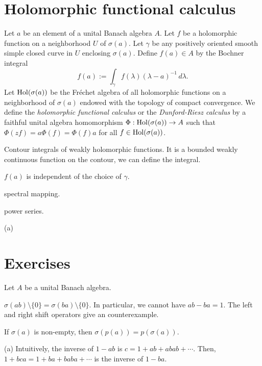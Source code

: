 \documentclass{../../large}
\begin{document}
\begin{prb}
\end{prb}


\section{Holomorphic functional calculus}


\begin{prb}
Let $a$ be an element of a unital Banach algebra $A$.
Let $f$ be a holomorphic function on a neighborhood $U$ of $\sigma(a)$.
Let $\gamma$ be any positively oriented smooth simple closed curve in $U$ enclosing $\sigma(a)$.
Define $f(a)\in A$ by the Bochner integral
\[f(a):=\int_\gamma f(\lambda)(\lambda-a)^{-1}\,d\lambda.\]
Let $\operatorname{Hol}(\sigma(a))$ be the Fr\'echet algebra of all holomorphic functions on a neighborhood of $\sigma(a)$ endowed with the topology of compact convergence.
We define the \emph{holomorphic functional calculus} or the \emph{Dunford-Riesz calculus} by a faithful unital algebra homomorphism $\Phi:\operatorname{Hol}(\sigma(a))\to A$ such that $\Phi(zf)=a\Phi(f)=\Phi(f)a$ for all $f\in\operatorname{Hol}(\sigma(a))$.

Contour integrals of weakly holomorphic functions.
It is a bounded weakly continuous function on the contour, we can define the integral.


\begin{parts}
\item $f(a)$ is independent of the choice of $\gamma$.
\item spectral mapping.
\item power series.
\end{parts}
\end{prb}
\begin{pf}
(a)


\end{pf}

\section*{Exercises}
\begin{prb}
Let $A$ be a unital Banach algebra.
\begin{parts}
\item $\sigma(ab)\setminus\{0\}=\sigma(ba)\setminus\{0\}$. In particular, we cannot have $ab-ba=1$. The left and right shift operators give an counterexample.
\item If $\sigma(a)$ is non-empty, then $\sigma(p(a))=p(\sigma(a))$.
\end{parts}
\end{prb}
\begin{pf}
(a)
Intuitively, the inverse of $1-ab$ is $c=1+ab+abab+\cdots$.
Then, $1+bca=1+ba+baba+\cdots$ is the inverse of $1-ba$.
\end{pf}
\end{document}
